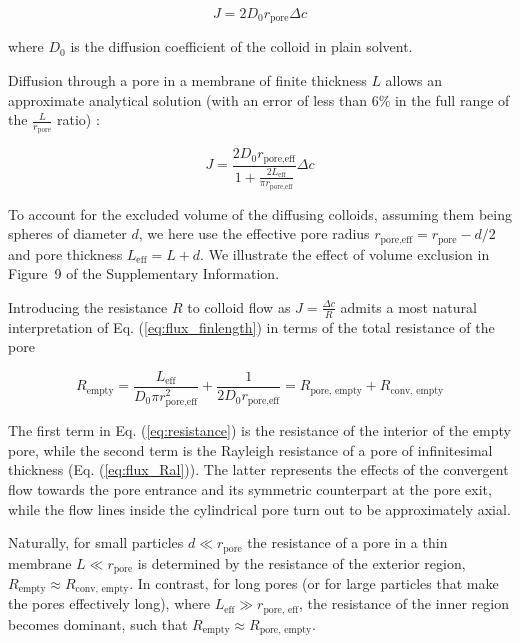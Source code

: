 \documentclass[12pt, a4paper]{article}
\begin{document}
\begin{equation}
    J=2D_0r_{\text{pore}}\Delta c
    \label{eq:flux_Ral}
\end{equation}

\noindent where $D_0$ is the diffusion coefficient of the colloid in plain solvent. 

Diffusion through a pore in a membrane of finite thickness $L$ allows an approximate analytical solution (with an error of less than 6\% in the full range of the $\frac{L}{r_{\text{pore}}}$ ratio) \cite{Brunn1984}: 

\begin{equation}
    J=\frac{2D_0r_{\text{pore,eff}}}{1+\frac{2L_{\text{eff}}}{\pi r_{\text{pore,eff}}}}\Delta c
    \label{eq:flux_finlength}
\end{equation}

\noindent To account for the excluded volume of the diffusing colloids, assuming them being spheres of diameter $d$, we here use the effective pore radius $r_{\text{pore,eff}}=r_{\text{pore}}-d/2$ and pore thickness $L_{\text{eff}} = L + d$.
We illustrate the effect of volume exclusion in Figure~9 of the Supplementary Information.

Introducing the resistance $R$ to colloid flow as $J=\frac{\Delta c}{R}$ admits a most natural interpretation of Eq. (\ref{eq:flux_finlength}) in terms of the total resistance of the pore

\begin{equation}
    R_{\text{empty}}=\frac{L_{\text{eff}}}{D_0\pi r_{\text{pore,eff}}^{2}}+\frac{1}{2D_0r_{\text{pore,eff}}}=R_{\text{pore, empty}}+R_{\text{conv, empty}}
    \label{eq:resistance}
\end{equation}

\noindent The first term in Eq. (\ref{eq:resistance}) is the resistance of the interior of the empty pore, 
while the second term is the Rayleigh resistance of a pore of infinitesimal thickness (Eq. (\ref{eq:flux_Ral})). 
The latter represents the effects of the convergent flow towards the pore entrance and its symmetric counterpart at the pore exit, 
while the flow lines inside the cylindrical pore turn out to be approximately axial.

Naturally, for small particles $d \ll r_{\text{pore}}$ the resistance of a pore in a thin membrane $L \ll r_{\text{pore}}$ is determined by the resistance of the exterior region, $R_{\text{empty}} \approx R_{\text{conv, empty}}$.
In contrast, for long pores (or for large particles that make the pores effectively long), where $L_{\text{eff}} \gg r_{\text{pore, eff}}$, the resistance of the inner region becomes dominant, such that $R_{\text{empty}} \approx R_{\text{pore, empty}}$.
\end{document}
